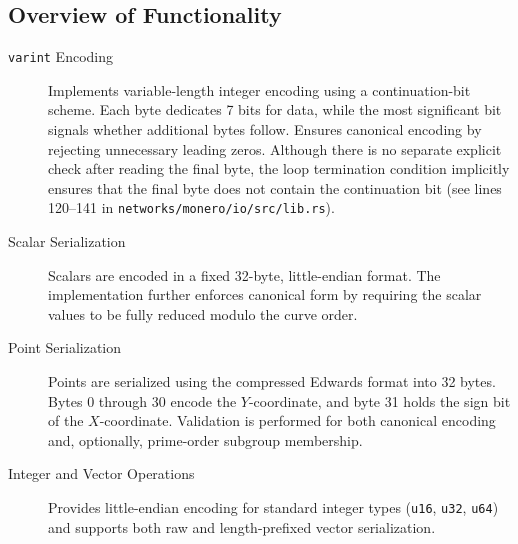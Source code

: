 \documentclass[12pt,a4paper]{article}
\begin{document}
\subsection{Overview of Functionality}
\begin{description}
    \item[\texttt{varint} Encoding] 
    Implements variable-length integer encoding using a continuation-bit scheme. Each byte dedicates 7 bits for data, while the most significant bit signals whether additional bytes follow. 
    Ensures canonical encoding by rejecting unnecessary leading zeros. 
    Although there is no separate explicit check after reading the final byte, the loop termination condition implicitly ensures that the final byte does not contain the continuation bit (see lines 120--141 in \texttt{networks/monero/io/src/lib.rs}).

    \item[Scalar Serialization] 
    Scalars are encoded in a fixed 32-byte, little-endian format. The implementation further enforces canonical form by requiring the scalar values to be fully reduced modulo the curve order.

    \item[Point Serialization] 
    Points are serialized using the compressed Edwards format into 32 bytes. Bytes 0 through 30 encode the $Y$-coordinate, and byte 31 holds the sign bit of the $X$-coordinate. Validation is performed for both canonical encoding and, optionally, prime-order subgroup membership.

    \item[Integer and Vector Operations] 
    Provides little-endian encoding for standard integer types (\texttt{u16}, \texttt{u32}, \texttt{u64}) and supports both raw and length-prefixed vector serialization.

\end{description}
\end{document}
